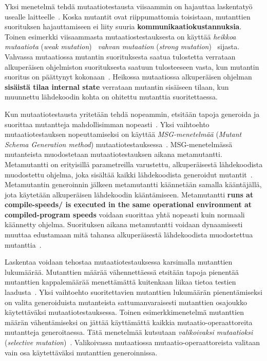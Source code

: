 \documentclass[finnish, grading]{tktltiki2}
\theoremstyle{definition}
\theoremstyle{remark}
\begin{document}
Yksi menetelmä tehdä mutaatiotestausta viisaammin on hajauttaa laskentatyö usealle laitteelle~\cite[s. 38]{Offutt:Untch:2001}. Koska mutantit ovat riippumattomia toisistaan, mutanttien suorituksen hajauttamiseen ei liity suuria \textbf{kommunikaatiokustannuksia}. Toinen esimerkki viisaammasta mutaatiostestauksesta on käyttää \textit{heikkoa mutaatiota} (\textit{weak mutation})~\cite[s. 37]{Offutt:Untch:2001} \textit{vahvan mutaation} (\textit{strong mutation})~\cite[s. 655]{Jia:Harman:2011} sijasta. Vahvassa mutaatiossa mutantin suorituksesta saatua tulostetta verrataan alkuperäisen ohjelmiston suorituksesta saatuun tulosteeseen vasta, kun mutantin suoritus on päättynyt kokonaan~\cite[s. 37]{Offutt:Untch:2001}. Heikossa mutaatiossa alkuperäisen ohjelman \textbf{sisäistä tilaa internal state} verrataan mutantin sisäiseen tilaan, kun muunnettu lähdekoodin kohta on ohitettu mutanttia suoritettaessa.

Kun mutaatiotestausta yritetään tehdä nopeammin, etsitään tapoja generoida ja suorittaa mutantteja mahdollisimman nopeasti~\cite[s. 37]{Offutt:Untch:2001}. Yksi vaihtoehto mutaatiotestauksen nopeuttamiseksi on käyttää \textit{MSG-menetelmää} (\textit{Mutant Schema Generation method}) mutaatiotestauksessa~\cite[s. 38]{Offutt:Untch:2001}. MSG-menetelmässä mutanteista muodostetaan mutaatiotestauksen aikana metamutantti. Metamutantti on erityisillä parametreilla varustettu, alkuperäisestä lähdekoodista muodostettu ohjelma, joka sisältää kaikki lähdekoodista generoidut mutantit~\cite[s. 104]{Ma:Offutt:Kwon:2005:MuAutomated}. Metamutantin generoinnin jälkeen metamutantti käännetään samalla kääntäjällä, jota käytetään alkuperäisen lähdekoodin kääntämiseen. Metamutantti \textbf{runs at compile-speeds/ is executed in the same operational environment at com\-pi\-led-prog\-ram speeds} voidaan suorittaa yhtä nopeasti kuin normaali käännetty ohjelma. Suorituksen aikana metamutantti voidaan dynaamisesti muuttaa edustamaan mitä tahansa alkuperäisestä lähdekoodista muodostettua mutanttia~\cite[s. 106]{Ma:Offutt:Kwon:2005:MuAutomated}.

Laskentaa voidaan tehostaa mutaatiotestauksessa karsimalla mutanttien lukumäärää. Mutanttien määrää vähennettäessä etsitään tapoja pienentää mutanttien kappalemäärää menettämättä kuitenkaan liikaa tietoa testien laadusta~\cite[s. 37]{Offutt:Untch:2001}. Yksi vaihtoehto suoritettavien mutanttien lukumäärän pienentämiseksi on valita generoiduista mutanteista sattumanvaraisesti mutanttien osajoukko käytettäväksi mutaatiotestauksessa. Toinen esimerkkimenetelmä mutanttien määrän vähentämiseksi on jättää käyttämättä kaikkia mutaatio-operaattoreita mutantteja generoitaessa. Tätä menetelmää kutsutaan \textit{valikoivaksi mutaatioksi} (\textit{selective mutation})~\cite[s. 37]{Offutt:Untch:2001}. Valikoivassa mutaatiossa mutaatio-operaattoreista valitaan vain osa käytettäväksi mutanttien generoinnissa. 
\end{document}
